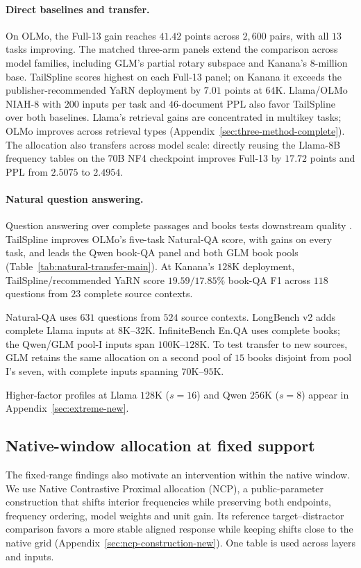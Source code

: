 \paragraph{Direct baselines and transfer.}
On OLMo, the Full-13 gain reaches $41.42$ points across $2{,}600$ pairs,
with all $13$ tasks improving.
The matched three-arm panels extend the comparison across model families,
including GLM's partial rotary subspace and Kanana's $8$-million base.
TailSpline scores highest on each Full-13 panel; on Kanana it exceeds the
publisher-recommended YaRN deployment by $7.01$ points at $64$K. Llama/OLMo NIAH-$8$ with $200$ inputs per task and $46$-document
PPL also favor TailSpline over both baselines. Llama's retrieval gains are
concentrated in multikey tasks; OLMo improves across retrieval types
(Appendix~\ref{sec:three-method-complete}). The allocation also transfers
across model scale: directly reusing the Llama-$8$B frequency tables on the
$70$B NF4 checkpoint improves Full-13 by $17.72$ points and PPL from
$2.5075$ to $2.4954$.

\paragraph{Natural question answering.}
Question answering over complete passages and books tests downstream quality
\citep{yen2024helmet}. TailSpline improves OLMo's five-task Natural-QA
score, with gains on every task, and leads the Qwen book-QA panel and both
GLM book pools (Table~\ref{tab:natural-transfer-main}). At Kanana's $128$K deployment,
TailSpline/recommended YaRN score $19.59/17.85\%$ book-QA F1
across $118$ questions from $23$ complete source contexts.

Natural-QA uses $631$ questions from $524$ source contexts. LongBench v2
\citep{bai2025longbenchv2} adds complete Llama inputs at $8$K--$32$K.
InfiniteBench En.QA \citep{zhang2024infinitebench} uses complete books;
the Qwen/GLM pool-I inputs span $100$K--$128$K. To test transfer to new
sources, GLM retains the same allocation on a second pool of $15$ books
disjoint from pool I's seven, with complete inputs spanning $70$K--$95$K.


\label{sec:interval-main}
Higher-factor profiles at Llama $128$K ($s=16$) and Qwen $256$K ($s=8$)
appear in Appendix~\ref{sec:extreme-new}.

\subsection{Native-window allocation at fixed support}
\label{sec:ncp-main}
The fixed-range findings also motivate an intervention within the native
window. We use Native Contrastive Proximal allocation (NCP), a public-parameter
construction that shifts interior frequencies while preserving both endpoints,
frequency ordering, model weights and unit gain. Its reference target--distractor
comparison favors a more stable aligned response while keeping shifts close
to the native grid (Appendix~\ref{sec:ncp-construction-new}). One table is
used across layers and inputs.

